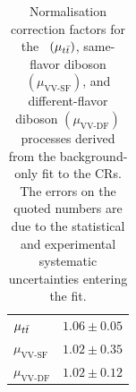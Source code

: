 \begin{table}[!htb]
    \begin{center}
        \caption{
            Normalisation correction factors for the \ttbar~$(\mu_{t\bar{t}})$,
            same-flavor diboson $(\mu_{\text{VV-SF}})$, and different-flavor diboson $(\mu_{\text{VV-DF}})$
            processes derived from the background-only fit to the CRs.
            The errors on the quoted numbers are due to the statistical and experimental systematic uncertainties
            entering the fit.
        }
        \label{tab:stop_scalefactors}
        \begin{tabular}{l|c}
            \hline
            \hline
                $\mu_{t\bar{t}}$ & $1.06 \pm 0.05$ \\
                $\mu_{\text{VV-SF}}$ & $1.02 \pm 0.35$ \\
                $\mu_{\text{VV-DF}}$ & $1.02 \pm 0.12$ \\
            \hline
            \hline
        \end{tabular}
    \end{center}
\end{table}

